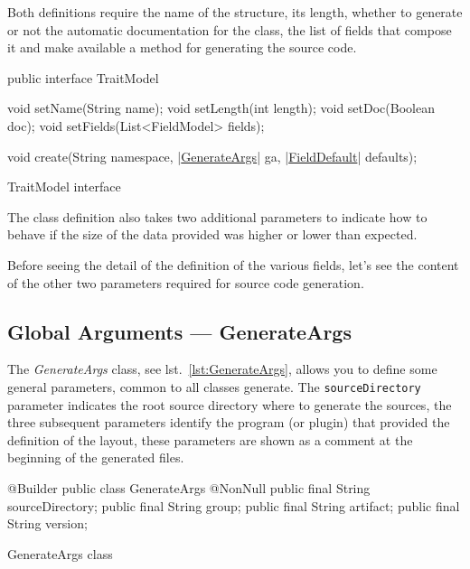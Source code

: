 \documentclass[a4paper,10pt]{report}
\newenvironment{elisting}[1][H]
  {\captionsetup{aboveskip=0pt}\begin{listing}[#1]}
  {\end{listing}%
}
\begin{document}
Both definitions require the name of the structure, its length, whether to 
generate or not the automatic documentation for the class, the list of fields 
that compose it and make available a method for generating the source code.

\begin{elisting}[!htb]
\begin{javacode}
public interface TraitModel {
    void setName(String name);
    void setLength(int length);
    void setDoc(Boolean doc);
    void setFields(List<FieldModel> fields);

    void create(String namespace, |\hyperref[lst:GenerateArgs]{GenerateArgs}| ga, |\hyperref[lst:FieldDefault]{FieldDefault}| defaults);
}
\end{javacode}
\caption{TraitModel interface}
\label{lst:TraitModel}
\end{elisting}
The class definition also takes two additional parameters to indicate how to 
behave if the size of the data provided was higher or lower than expected.

Before seeing the detail of the definition of the various fields, let's see the 
content of the other two parameters required for source code generation.

\subsection{Global Arguments --- GenerateArgs}
The \textsl{GenerateArgs} class, see lst.~\ref{lst:GenerateArgs}, allows you to 
define some general parameters, common to all classes generate. 
The \texttt{sourceDirectory} parameter indicates the root source directory where
to generate the sources, the three subsequent parameters identify the program 
(or plugin) that provided the definition of the layout, these parameters are 
shown as a comment at the beginning of the generated files.

\begin{elisting}[!htb]
\begin{javacode}
@Builder
public class GenerateArgs {
    @NonNull public final String sourceDirectory;
    public final String group;
    public final String artifact;
    public final String version;
}
\end{javacode}
\caption{GenerateArgs class}
\label{lst:GenerateArgs}
\end{elisting}
\end{document}
